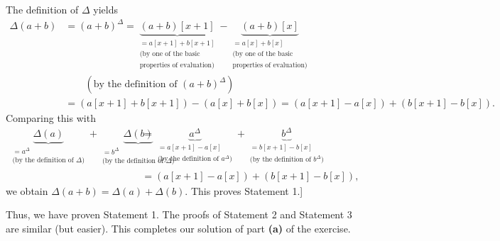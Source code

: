 \documentclass[paper=a4, fontsize=12pt]{scrartcl}%
\theoremstyle{plainsl}
\theoremstyle{definition}
\theoremstyle{remark}
\begin{document}
The definition of $\Delta$ yields%
\begin{align*}
\Delta\left(  a+b\right)   &  =\left(  a+b\right)  ^{\Delta}%
=\underbrace{\left(  a+b\right)  \left[  x+1\right]  }_{\substack{=a\left[
x+1\right]  +b\left[  x+1\right]  \\\text{(by one of the basic}%
\\\text{properties of evaluation)}}}-\underbrace{\left(  a+b\right)  \left[
x\right]  }_{\substack{=a\left[  x\right]  +b\left[  x\right]  \\\text{(by one
of the basic}\\\text{properties of evaluation)}}}\\
&  \qquad\left(  \text{by the definition of }\left(  a+b\right)  ^{\Delta
}\right) \\
&  =\left(  a\left[  x+1\right]  +b\left[  x+1\right]  \right)  -\left(
a\left[  x\right]  +b\left[  x\right]  \right)  =\left(  a\left[  x+1\right]
-a\left[  x\right]  \right)  +\left(  b\left[  x+1\right]  -b\left[  x\right]
\right)  .
\end{align*}
Comparing this with%
\begin{align*}
\underbrace{\Delta\left(  a\right)  }_{\substack{=a^{\Delta}\\\text{(by the
definition of }\Delta\text{)}}}+\underbrace{\Delta\left(  b\right)
}_{\substack{=b^{\Delta}\\\text{(by the definition of }\Delta\text{)}}}  &
=\underbrace{a^{\Delta}}_{\substack{=a\left[  x+1\right]  -a\left[  x\right]
\\\text{(by the definition of }a^{\Delta}\text{)}}}+\underbrace{b^{\Delta}%
}_{\substack{=b\left[  x+1\right]  -b\left[  x\right]  \\\text{(by the
definition of }b^{\Delta}\text{)}}}\\
&  =\left(  a\left[  x+1\right]  -a\left[  x\right]  \right)  +\left(
b\left[  x+1\right]  -b\left[  x\right]  \right)  ,
\end{align*}
we obtain $\Delta\left(  a+b\right)  =\Delta\left(  a\right)  +\Delta\left(
b\right)  $. This proves Statement 1.]

Thus, we have proven Statement 1. The proofs of Statement 2 and Statement 3
are similar (but easier). This completes our solution of part \textbf{(a)} of
the exercise.

\bigskip
\end{document}
